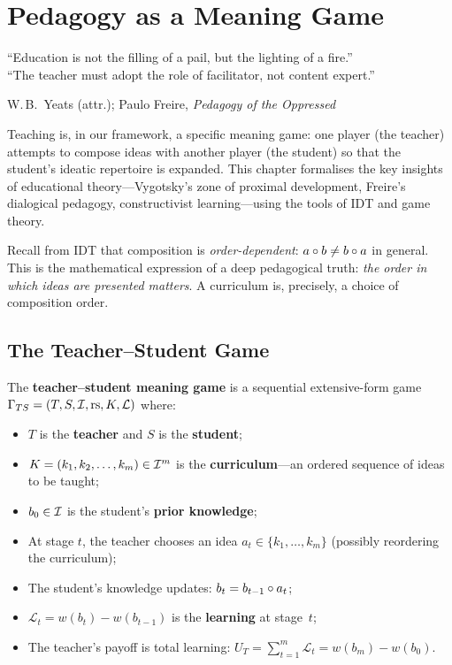 \chapter{Pedagogy as a Meaning Game}
\label{ch:pedagogy}

\epigraph{``Education is not the filling of a pail, but the lighting
of a fire.''\\[3pt]
``The teacher must adopt the role of facilitator, not
content expert.''}{W.\,B.\ Yeats (attr.); Paulo Freire, \textit{Pedagogy of the Oppressed}}

Teaching is, in our framework, a specific meaning game: one player
(the teacher) attempts to compose ideas with another player
(the student) so that the student's ideatic repertoire is
expanded.  This chapter formalises the key insights of educational
theory---Vygotsky's zone of proximal development, Freire's
dialogical pedagogy, constructivist learning---using the tools
of IDT and game theory.

Recall from IDT that composition is \emph{order-dependent}: $a \circ b
\ne b \circ a$ in general.  This is the mathematical expression
of a deep pedagogical truth: \emph{the order in which ideas are
presented matters}.  A curriculum is, precisely, a choice of
composition order.

\section{The Teacher--Student Game}
\label{sec:teacher-student}

\begin{game}
\label{game:teacher-student}
The \textbf{teacher--student meaning game} is a sequential
extensive-form game $\Gamma_{TS} = (T, S, \mathcal{I}, \mathrm{rs}, K, \mathcal{L})$ where:
\begin{itemize}
  \item $T$ is the \textbf{teacher} and $S$ is the \textbf{student};
  \item $K = (k_1, k_2, \ldots, k_m) \in \mathcal{I}^m$ is the \textbf{curriculum}---an ordered sequence of ideas to be taught;
  \item $b_0 \in \mathcal{I}$ is the student's \textbf{prior knowledge};
  \item At stage $t$, the teacher chooses an idea $a_t \in
    \{k_1,\ldots,k_m\}$ (possibly reordering the curriculum);
  \item The student's knowledge updates: $b_t = b_{t-1} \circ a_t$;
  \item $\mathcal{L}_t = w(b_t) - w(b_{t-1})$ is the
    \textbf{learning} at stage~$t$;
  \item The teacher's payoff is total learning:
    $U_T = \sum_{t=1}^m \mathcal{L}_t = w(b_m) - w(b_0)$.
\end{itemize}
\end{game}

